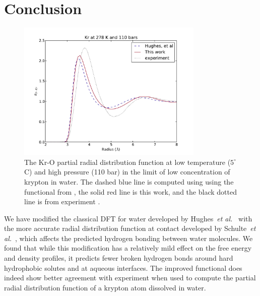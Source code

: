 

\section{Conclusion}

\begin{figure}
\begin{center}
\includegraphics[width=3.5in]{figs/Kr-278K-densities}
\end{center}
\caption{ The Kr-O partial radial distribution function at low
  temperature ($5^\circ$ C) and high pressure (110 bar) in the limit
  of low concentration of krypton in water. The dashed blue line is
  computed using using the functional from \hughesetal, the solid red
  line is this work, and the black dotted line is from experiment
  \cite{bowron1998hydrophobic}. }
\label{fig:g-Kr}
\end{figure}

We have modified the classical DFT for water developed by
Hughes~\emph{et al.}~\cite{hughes2013classical} with the more accurate
radial distribution function at contact developed by Schulte~\emph{et
  al.}~\cite{schulte2012using}, which affects the predicted hydrogen
bonding between water molecules.  We found that while this
modification has a relatively mild effect on the free energy and
density profiles, it predicts fewer broken hydrogen bonds around
hard hydrophobic solutes and at aqueous interfaces.
%
The improved functional does indeed show better agreement with
experiment when used to compute the partial radial distribution
function of a krypton atom dissolved in water.

